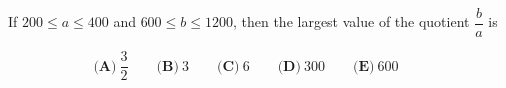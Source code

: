 If $ 200 \le a \le 400$ and $ 600 \le b \le 1200$, then the largest value of the quotient $ \dfrac{b}{a}$ is



\[ \textbf{(A)}\ \dfrac{3}{2} \qquad
\textbf{(B)}\ 3 \qquad
\textbf{(C)}\ 6 \qquad
\textbf{(D)}\ 300 \qquad
\textbf{(E)}\ 600 \qquad
\]
